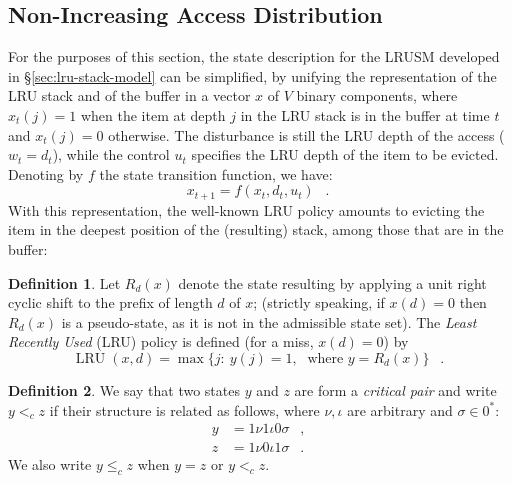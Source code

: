 \documentclass[11pt,a4paper]{article}
\DeclareMathOperator{\lru}{LRU}
\DeclareMathOperator{\mf}{\enspace .}
\DeclareMathOperator{\mc}{\enspace ,}
\theoremstyle{definition}
\newtheorem{definition}{Definition}
\theoremstyle{remark}
\begin{document}
\subsection{Non-Increasing Access Distribution}
\label{sec:proof-thm.-reflruthm}

For the purposes of this section, the state description for the LRUSM
developed in \S\ref{sec:lru-stack-model} can be simplified, by
unifying the representation of the LRU stack and of the buffer in a
vector $x$ of $V$ binary components, where $x_t(j)=1$ when the item at
depth $j$ in the LRU stack is in the buffer at time $t$ and $x_t(j)=0$
otherwise.  The disturbance is still the LRU depth of the access
($w_t=d_t$), while the control $u_t$ specifies the LRU depth of the
item to be evicted.  Denoting by $f$ the state transition function, we
have:
\begin{equation}
  x_{t+1}=f(x_t,d_t,u_t) \mf  
\end{equation}
With this representation, the well-known LRU policy amounts to
evicting the item in the deepest position of the (resulting) stack,
among those that are in the buffer:
\begin{definition}
  Let $R_d(x)$ denote the state resulting by applying a unit right
  cyclic shift to the prefix of length $d$ of $x$; (strictly speaking,
  if $x(d)=0$ then $R_d(x)$ is a pseudo-state, as it is not in the
  admissible state set).  The \emph{Least Recently Used} (LRU) policy
  is defined (for a miss, $x(d)=0$) by
  \begin{equation}\label{eqn:lru}
      \lru(x,d) = \max\{j:~y(j)=1, \;\text{ where } y=R_d(x)\}\mf
  \end{equation}
\end{definition}

\begin{definition}
  We say that two states $y$ and $z$ are form a \emph{critical pair}
  and write $y <_c z$ if their structure is related as follows, where
  $\nu,\iota$ are arbitrary and $\sigma \in 0^*$:
\begin{equation} \begin{split} y &=
  1\nu1\iota0\sigma \mc\\ z &= 1\nu0\iota1\sigma \mf \end{split}
  \end{equation}
We also write $y \leq_c z$ when $y = z$ or $y <_c z$.
\end{definition}
\end{document}
